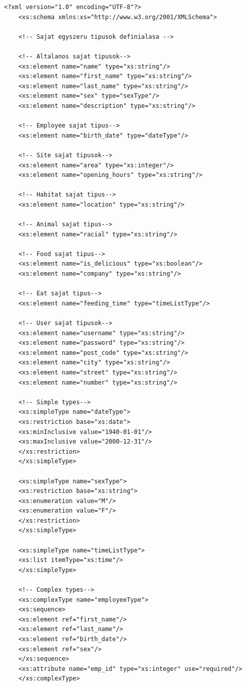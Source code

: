 \documentclass[12pt]{report}
\begin{document}
\begin{lstlisting}[caption={Az XSD dokumentum}]
	<?xml version="1.0" encoding="UTF-8"?>
	<xs:schema xmlns:xs="http://www.w3.org/2001/XMLSchema">
	
	<!-- Sajat egyszeru tipusok definialasa -->
	
	<!-- Altalanos sajat tipusok-->
	<xs:element name="name" type="xs:string"/>
	<xs:element name="first_name" type="xs:string"/>
	<xs:element name="last_name" type="xs:string"/>
	<xs:element name="sex" type="sexType"/>
	<xs:element name="description" type="xs:string"/>
	
	<!-- Employee sajat tipus-->
	<xs:element name="birth_date" type="dateType"/>
	
	<!-- Site sajat tipusok-->
	<xs:element name="area" type="xs:integer"/>
	<xs:element name="opening_hours" type="xs:string"/>
	
	<!-- Habitat sajat tipus-->
	<xs:element name="location" type="xs:string"/>
	
	<!-- Animal sajat tipus-->
	<xs:element name="racial" type="xs:string"/>
	
	<!-- Food sajat tipus-->
	<xs:element name="is_delicious" type="xs:boolean"/>
	<xs:element name="company" type="xs:string"/>
	
	<!-- Eat sajat tipus-->
	<xs:element name="feeding_time" type="timeListType"/>
	
	<!-- User sajat tipusok-->
	<xs:element name="username" type="xs:string"/>
	<xs:element name="password" type="xs:string"/>
	<xs:element name="post_code" type="xs:string"/>
	<xs:element name="city" type="xs:string"/>
	<xs:element name="street" type="xs:string"/>
	<xs:element name="number" type="xs:string"/>
	
	<!-- Simple types-->
	<xs:simpleType name="dateType">
	<xs:restriction base="xs:date">
	<xs:minInclusive value="1940-01-01"/>
	<xs:maxInclusive value="2000-12-31"/>
	</xs:restriction>
	</xs:simpleType>
	
	<xs:simpleType name="sexType">
	<xs:restriction base="xs:string">
	<xs:enumeration value="M"/>
	<xs:enumeration value="F"/>
	</xs:restriction>
	</xs:simpleType>
	
	<xs:simpleType name="timeListType">
	<xs:list itemType="xs:time"/>
	</xs:simpleType>
	
	<!-- Complex types-->
	<xs:complexType name="employeeType">
	<xs:sequence>
	<xs:element ref="first_name"/>
	<xs:element ref="last_name"/>
	<xs:element ref="birth_date"/>
	<xs:element ref="sex"/>
	</xs:sequence>
	<xs:attribute name="emp_id" type="xs:integer" use="required"/>
	</xs:complexType>
	

\end{lstlisting}
\end{document}
